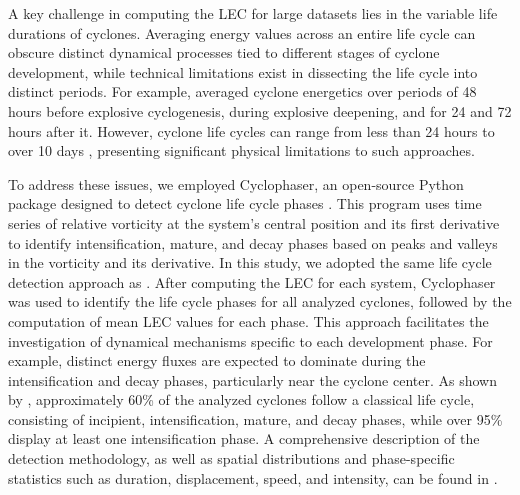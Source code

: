 \documentclass[pdflatex,sn-chicago]{sn-jnl}%
\theoremstyle{plain}
\theoremstyle{definition}
\theoremstyle{remark}
\theoremstyle{definition}
\begin{document}
A key challenge in computing the LEC for large datasets lies in the variable life durations of cyclones. Averaging energy values across an entire life cycle can obscure distinct dynamical processes tied to different stages of cyclone development, while technical limitations exist in dissecting the life cycle into distinct periods. For example, \citet{black2013universal} averaged cyclone energetics over periods of 48 hours before explosive cyclogenesis, during explosive deepening, and for 24 and 72 hours after it. However, cyclone life cycles can range from less than 24 hours to over 10 days \citep{trigo2006climatology,reboita2010south,gramcianinov2019properties}, presenting significant physical limitations to such approaches.

To address these issues, we employed Cyclophaser, an open-source Python package designed to detect cyclone life cycle phases \citep{de2025cyclophaser}. This program uses time series of relative vorticity at the system's central position and its first derivative to identify intensification, mature, and decay phases based on peaks and valleys in the vorticity and its derivative. In this study, we adopted the same life cycle detection approach as \citet{couto2024new}. After computing the LEC for each system, Cyclophaser was used to identify the life cycle phases for all analyzed cyclones, followed by the computation of mean LEC values for each phase. This approach facilitates the investigation of dynamical mechanisms specific to each development phase. For example, distinct energy fluxes are expected to dominate during the intensification and decay phases, particularly near the cyclone center. As shown by \citet{couto2024new}, approximately 60\% of the analyzed cyclones follow a classical life cycle, consisting of incipient, intensification, mature, and decay phases, while over 95\% display at least one intensification phase. A comprehensive description of the detection methodology, as well as spatial distributions and phase-specific statistics such as duration, displacement, speed, and intensity, can be found in \citet{couto2024new}.
\end{document}

